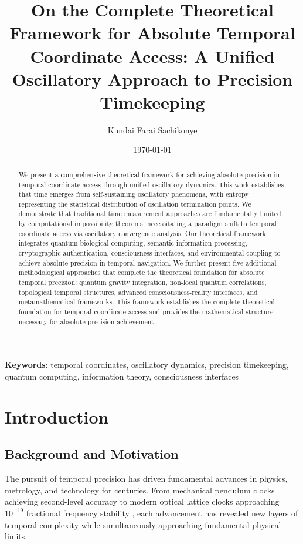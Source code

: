 \documentclass[11pt]{article}
\title{On the Complete Theoretical Framework for Absolute Temporal Coordinate Access: A Unified Oscillatory Approach to Precision Timekeeping}
\author{Kundai Farai Sachikonye}
\date{\today}
\theoremstyle{remark}
\begin{document}
\maketitle

\begin{abstract}
We present a comprehensive theoretical framework for achieving absolute precision in temporal coordinate access through unified oscillatory dynamics. This work establishes that time emerges from self-sustaining oscillatory phenomena, with entropy representing the statistical distribution of oscillation termination points. We demonstrate that traditional time measurement approaches are fundamentally limited by computational impossibility theorems, necessitating a paradigm shift to temporal coordinate access via oscillatory convergence analysis. Our theoretical framework integrates quantum biological computing, semantic information processing, cryptographic authentication, consciousness interfaces, and environmental coupling to achieve absolute precision in temporal navigation. We further present five additional methodological approaches that complete the theoretical foundation for absolute temporal precision: quantum gravity integration, non-local quantum correlations, topological temporal structures, advanced consciousness-reality interfaces, and metamathematical frameworks. This framework establishes the complete theoretical foundation for temporal coordinate access and provides the mathematical structure necessary for absolute precision achievement.
\end{abstract}

\textbf{Keywords}: temporal coordinates, oscillatory dynamics, precision timekeeping, quantum computing, information theory, consciousness interfaces

\section{Introduction}

\subsection{Background and Motivation}

The pursuit of temporal precision has driven fundamental advances in physics, metrology, and technology for centuries. From mechanical pendulum clocks achieving second-level accuracy to modern optical lattice clocks approaching $10^{-19}$ fractional frequency stability \cite{ludlow2015optical,bothwell2019jila}, each advancement has revealed new layers of temporal complexity while simultaneously approaching fundamental physical limits.
\end{document}
